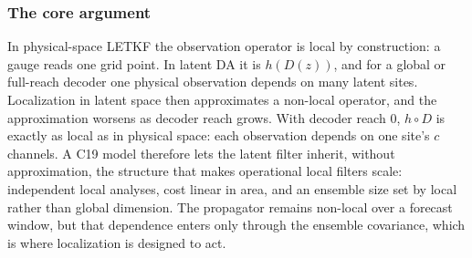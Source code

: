 \documentclass[11pt]{article}
\begin{document}
\subsubsection*{The core argument}
In physical-space LETKF the observation operator is local by
construction: a gauge reads one grid point. In latent DA it is
$h(D(z))$, and for a global or full-reach decoder one physical
observation depends on many latent sites. Localization in latent space
then approximates a non-local operator, and the approximation worsens as
decoder reach grows. With decoder reach 0, $h\circ D$ is exactly as local
as in physical space: each observation depends on one site's $c$
channels. A C19 model therefore lets the latent filter inherit, without
approximation, the structure that makes operational local filters
scale: independent local analyses, cost linear in area, and an ensemble
size set by local rather than global dimension. The propagator remains
non-local over a forecast window, but that dependence enters only
through the ensemble covariance, which is where localization is
designed to act.
\end{document}
